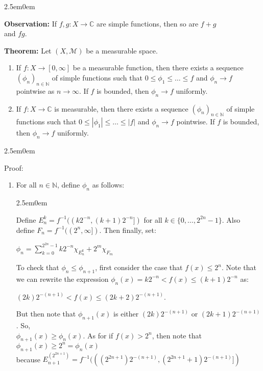 \documentclass{book}
\newcommand{\hTwo}{%
\color{MidnightBlue}%
   \fontsize{13}{15}\selectfont%
}
\newcommand{\hThree}{%
   \color{PineGreen!85!Orange}
   \fontsize{12}{14}\selectfont%
}
\newenvironment{myIndent}{%
   \begin{adjustwidth}{2.5em}{0em}%
}{%
   \end{adjustwidth}%
}
\newcommand{\blab}[1]{\textbf{#1}}
\newcommand{\retTwo}{\hfill\bigbreak}
\begin{document}
\begin{myIndent}\hTwo
   \blab{Observation:} If $f, g: X \longrightarrow \mathbb{C}$ are simple functions, then so are $f + g$\\ and $fg$.\retTwo

   \blab{Theorem:} Let $(X, \mathcal{M})$ be a measurable space.
   \begin{enumerate}
      \item If $f: X \longrightarrow [0, \infty]$ be a measurable function,  then there exists a sequence $(\phi_n)_{n \in \mathbb{N}}$ of simple functions such that $0 \leq \phi_1 \leq \ldots \leq f$ and $\phi_n \rightarrow f$ pointwise as $n \rightarrow \infty$. If $f$ is bounded, then $\phi_n \rightarrow f$ uniformly.\retTwo
      
      \item If $f: X \longrightarrow \mathbb{C}$ is measurable, then there exists a sequence $(\phi_n)_{n \in \mathbb{N}}$ of simple functions such that $0 \leq |\phi_1| \leq \ldots \leq |f|$ and $\phi_n \rightarrow f$ pointwise. If $f$ is bounded, then $\phi_n \rightarrow f$ uniformly.
   \end{enumerate}
   
   \begin{myIndent}\hThree
      Proof:
      \begin{enumerate}
         \item For all $n \in \mathbb{N}$, define $\phi_n$ as follows:
         \begin{myIndent}
            Define $E_n^{k} = f^{-1}((k2^{-n}, (k+1)2^{-n}])$ for all $k \in \{0, \ldots, 2^{2n} - 1\}$. Also\\ define $F_n = f^{-1}((2^n, \infty])$. Then finally, set:

            {\centering $\phi_n = \sum\limits_{k=0}^{2^{2n} - 1}k2^{-n}\chi_{E_n^{k}} + 2^m\chi_{F_m}$ \retTwo\par}
         \end{myIndent}

         To check that $\phi_n \leq \phi_{n + 1}$, first consider the case that $f(x) \leq 2^n$. Note that we can rewrite the expression $\phi_n(x) = k2^{-n} < f(x) \leq (k + 1)2^{-n}$ as:
         
         {\centering $(2k)2^{-(n+1)} < f(x) \leq (2k+2)2^{-(n+1)}$.\retTwo\par}
         
         But then note that $\phi_{n+1}(x)$ is either $(2k)2^{-(n + 1)}$ or $(2k + 1)2^{-(n + 1)}$. So,\\ $\phi_{n + 1}(x) \geq \phi_n(x)$. As for if $f(x) > 2^n$, then note that $\phi_{n+1}(x) \geq 2^n = \phi_n(x)$\\ because $E_{n+1}^{(2^{2n + 1})} = f^{-1}(((2^{2n + 1})2^{-(n+1)}, (2^{2n + 1} + 1)2^{-(n+1)}])$\retTwo


\end{enumerate}
\end{myIndent}
\end{myIndent}
\end{document}
